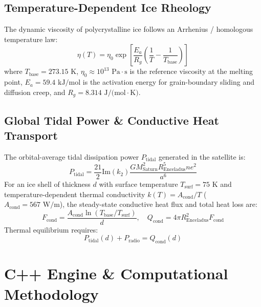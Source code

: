 \documentclass[11pt,a4paper]{article}
\begin{document}
\subsection{Temperature-Dependent Ice Rheology}
The dynamic viscosity of polycrystalline ice follows an Arrhenius / homologous temperature law:
\begin{equation}
\eta(T) = \eta_0 \exp \left[ \frac{E_a}{R_g} \left( \frac{1}{T} - \frac{1}{T_{\text{base}}} \right) \right]
\end{equation}
where $T_{\text{base}} = 273.15\text{ K}$, $\eta_0 \approx 10^{13}\text{ Pa}\cdot\text{s}$ is the reference viscosity at the melting point, $E_a = 59.4\text{ kJ/mol}$ is the activation energy for grain-boundary sliding and diffusion creep, and $R_g = 8.314\text{ J/(mol}\cdot\text{K)}$.

\subsection{Global Tidal Power \& Conductive Heat Transport}
The orbital-average tidal dissipation power $P_{\text{tidal}}$ generated in the satellite is:
\begin{equation}
P_{\text{tidal}} = \frac{21}{2} \text{Im}(k_2) \frac{G M_{\text{Saturn}}^2 R_{\text{Enceladus}}^5 n e^2}{a^6}
\end{equation}
For an ice shell of thickness $d$ with surface temperature $T_{\text{surf}} = 75\text{ K}$ and temperature-dependent thermal conductivity $k(T) = A_{\text{cond}}/T$ ($A_{\text{cond}} = 567\text{ W/m}$), the steady-state conductive heat flux and total heat loss are:
\begin{equation}
F_{\text{cond}} = \frac{A_{\text{cond}} \ln(T_{\text{base}} / T_{\text{surf}})}{d}, \quad Q_{\text{cond}} = 4\pi R_{\text{Enceladus}}^2 F_{\text{cond}}
\end{equation}
Thermal equilibrium requires:
\begin{equation}
P_{\text{tidal}}(d) + P_{\text{radio}} = Q_{\text{cond}}(d)
\end{equation}

\section{C++ Engine \& Computational Methodology}
\end{document}
